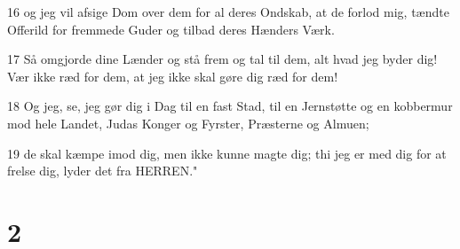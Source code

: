 \par 16 og jeg vil afsige Dom over dem for al deres Ondskab, at de forlod mig, tændte Offerild for fremmede Guder og tilbad deres Hænders Værk.
\par 17 Så omgjorde dine Lænder og stå frem og tal til dem, alt hvad jeg byder dig! Vær ikke ræd for dem, at jeg ikke skal gøre dig ræd for dem!
\par 18 Og jeg, se, jeg gør dig i Dag til en fast Stad, til en Jernstøtte og en kobbermur mod hele Landet, Judas Konger og Fyrster, Præsterne og Almuen;
\par 19 de skal kæmpe imod dig, men ikke kunne magte dig; thi jeg er med dig for at frelse dig, lyder det fra HERREN."

\chapter{2}

